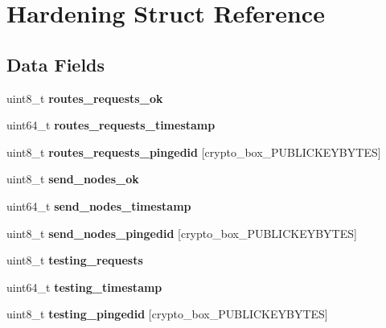 \hypertarget{struct_hardening}{\section{Hardening Struct Reference}
\label{struct_hardening}
}
\subsection*{Data Fields}
\begin{DoxyCompactItemize}
\item 
\hypertarget{struct_hardening_a3bc4c156861571ceca55275d95f6221b}{uint8\+\_\+t {\bfseries routes\+\_\+requests\+\_\+ok}}\label{struct_hardening_a3bc4c156861571ceca55275d95f6221b}

\item 
\hypertarget{struct_hardening_a55d6293fa06a8c4aa24e70706409b060}{uint64\+\_\+t {\bfseries routes\+\_\+requests\+\_\+timestamp}}\label{struct_hardening_a55d6293fa06a8c4aa24e70706409b060}

\item 
\hypertarget{struct_hardening_aee791c81812d61023e3ecc7ebc33f4c0}{uint8\+\_\+t {\bfseries routes\+\_\+requests\+\_\+pingedid} \mbox{[}crypto\+\_\+box\+\_\+\+P\+U\+B\+L\+I\+C\+K\+E\+Y\+B\+Y\+T\+E\+S\mbox{]}}\label{struct_hardening_aee791c81812d61023e3ecc7ebc33f4c0}

\item 
\hypertarget{struct_hardening_a11158e002f3685f4044a759680636c08}{uint8\+\_\+t {\bfseries send\+\_\+nodes\+\_\+ok}}\label{struct_hardening_a11158e002f3685f4044a759680636c08}

\item 
\hypertarget{struct_hardening_ab15e3d8f0b33943a6978fac3cde4d1a2}{uint64\+\_\+t {\bfseries send\+\_\+nodes\+\_\+timestamp}}\label{struct_hardening_ab15e3d8f0b33943a6978fac3cde4d1a2}

\item 
\hypertarget{struct_hardening_a2c2bfa7e3ff42e353bc44a2183ebc4df}{uint8\+\_\+t {\bfseries send\+\_\+nodes\+\_\+pingedid} \mbox{[}crypto\+\_\+box\+\_\+\+P\+U\+B\+L\+I\+C\+K\+E\+Y\+B\+Y\+T\+E\+S\mbox{]}}\label{struct_hardening_a2c2bfa7e3ff42e353bc44a2183ebc4df}

\item 
\hypertarget{struct_hardening_a48c7621d77e824da8df2c8a7caa79d25}{uint8\+\_\+t {\bfseries testing\+\_\+requests}}\label{struct_hardening_a48c7621d77e824da8df2c8a7caa79d25}

\item 
\hypertarget{struct_hardening_a3de9f4ec78dd99c4ca1a142e1c65fcee}{uint64\+\_\+t {\bfseries testing\+\_\+timestamp}}\label{struct_hardening_a3de9f4ec78dd99c4ca1a142e1c65fcee}

\item 
\hypertarget{struct_hardening_a4756e4396c1fe15e6ba6bdac38a60eee}{uint8\+\_\+t {\bfseries testing\+\_\+pingedid} \mbox{[}crypto\+\_\+box\+\_\+\+P\+U\+B\+L\+I\+C\+K\+E\+Y\+B\+Y\+T\+E\+S\mbox{]}}\label{struct_hardening_a4756e4396c1fe15e6ba6bdac38a60eee}

\end{DoxyCompactItemize}


